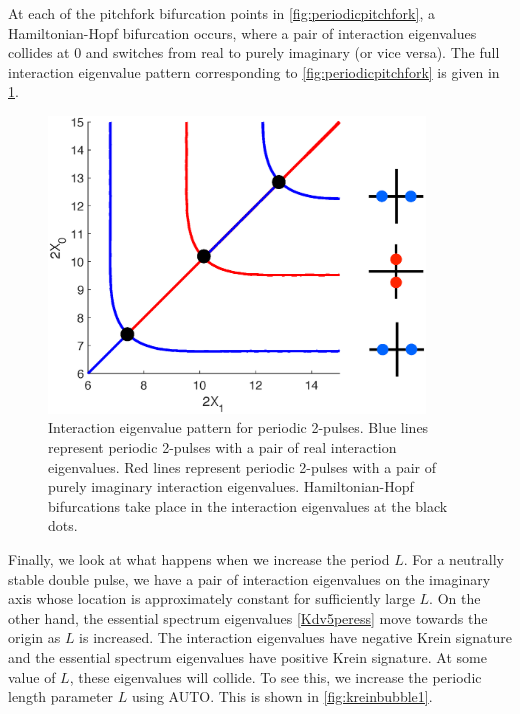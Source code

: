 \documentclass[thesis.tex]{subfiles}
\begin{document}
At each of the pitchfork bifurcation points in \cref{fig:periodicpitchfork}, a Hamiltonian-Hopf bifurcation occurs, where a pair of interaction eigenvalues collides at 0 and switches from real to purely imaginary (or vice versa). The full interaction eigenvalue pattern corresponding to \cref{fig:periodicpitchfork} is given in \cref{fig:2periodiceigpattern}.

\begin{figure}
\includegraphics[width=10cm]{images/kdv5numerics/2periodiceigpattern.eps}
\caption{Interaction eigenvalue pattern for periodic 2-pulses. Blue lines represent periodic 2-pulses with a pair of real interaction eigenvalues. Red lines represent periodic 2-pulses with a pair of purely imaginary interaction eigenvalues. Hamiltonian-Hopf bifurcations take place in the interaction eigenvalues at the black dots.}
\label{fig:2periodiceigpattern}
\end{figure}

Finally, we look at what happens when we increase the period $L$. For a neutrally stable double pulse, we have a pair of interaction eigenvalues on the imaginary axis whose location is approximately constant for sufficiently large $L$. On the other hand, the essential spectrum eigenvalues \cref{Kdv5peress} move towards the origin as $L$ is increased. The interaction eigenvalues have negative Krein signature and the essential spectrum eigenvalues have positive Krein signature. At some value of $L$, these eigenvalues will collide. To see this, we increase the periodic length parameter $L$ using AUTO. This is shown in \cref{fig:kreinbubble1}.
\end{document}
